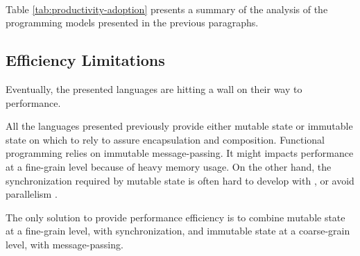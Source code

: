 \paragraph{}

Table \ref{tab:productivity-adoption} presents a summary of the analysis of the programming models presented in the previous paragraphs.


\subsection{Efficiency Limitations} \label{chapter3:software-productivity:performance-limitations}

Eventually, the presented languages are hitting a wall on their way to performance.

All the languages presented previously provide either mutable state or immutable state on which to rely to assure encapsulation and composition.
Functional programming relies on immutable message-passing.
It might impacts performance at a fine-grain level because of heavy memory usage.
On the other hand, the synchronization required by mutable state is often hard to develop with \cite{Adya2002}, or avoid parallelism \cite{Pai1999,Krohn2007}.

The only solution to provide performance efficiency is to combine mutable state at a fine-grain level, with synchronization, and immutable state at a coarse-grain level, with message-passing.





